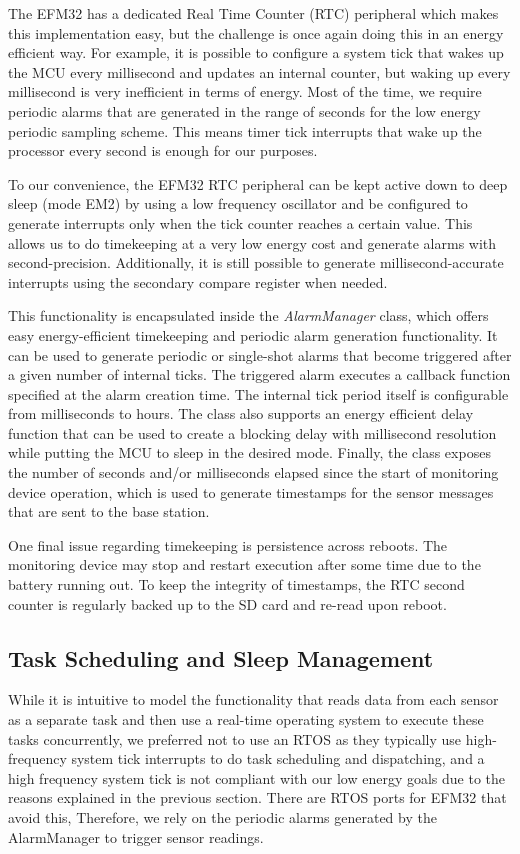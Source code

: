 The EFM32 has a dedicated  Real Time Counter (RTC) peripheral which makes this implementation easy, but the challenge is once again doing this in an energy efficient way. For example, it is possible to configure a system tick that wakes up the MCU every millisecond and updates an internal counter, but waking up every millisecond is very inefficient in terms of energy. Most of the time, we require periodic alarms that are generated in the range of seconds for the low energy periodic sampling scheme. This means timer tick interrupts that wake up the processor every second is enough for our purposes.

To our convenience, the EFM32 RTC peripheral can be kept active down to deep sleep (mode EM2) by using a low frequency oscillator and be configured to generate interrupts only when the tick counter reaches a certain value. This allows us to do timekeeping at a very low energy cost and generate alarms with second-precision. Additionally, it is still possible to generate millisecond-accurate interrupts using the secondary compare register when needed.

This functionality is encapsulated inside the \textit{AlarmManager} class, which offers easy energy-efficient timekeeping and periodic alarm generation functionality. It can be used to generate periodic or single-shot alarms that become triggered after a given number of internal ticks. The triggered alarm executes a callback function specified at the alarm creation time. The internal tick period itself is configurable from milliseconds to hours. The class also supports an energy efficient delay function that can be used to create a blocking delay with millisecond resolution while putting the MCU to sleep in the desired mode. Finally, the class exposes the number of seconds and/or milliseconds elapsed since the start of monitoring device operation, which is used to generate timestamps for the sensor messages that are sent to the base station.

One final issue regarding timekeeping is persistence across reboots. The monitoring device may stop and restart execution after some time due to the battery running out. To keep the integrity of timestamps, the RTC second counter is regularly backed up to the SD card and re-read upon reboot.

\subsection{Task Scheduling and Sleep Management}
While it is intuitive to model the functionality that reads data from each sensor as a separate task and then use a real-time operating system to execute these tasks concurrently, we preferred not to use an RTOS as they typically use high-frequency system tick interrupts to do task scheduling and dispatching, and a high frequency system tick is not compliant with our low energy goals due to the reasons explained in the previous section. There are RTOS ports for EFM32 that avoid this, Therefore, we rely on the periodic alarms generated by the AlarmManager to trigger sensor readings.

